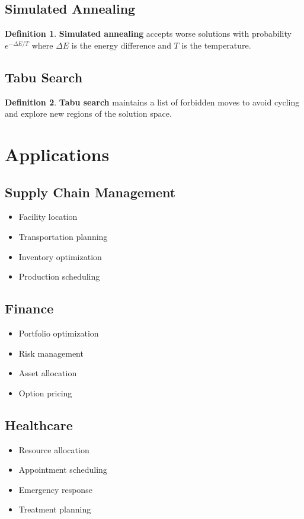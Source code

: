 \documentclass[11pt]{article}
\theoremstyle{definition}
\newtheorem{definition}{Definition}[section]
\begin{document}
\subsection{Simulated Annealing}
\begin{definition}
\textbf{Simulated annealing} accepts worse solutions with probability $e^{-\Delta E/T}$ where $\Delta E$ is the energy difference and $T$ is the temperature.
\end{definition}

\subsection{Tabu Search}
\begin{definition}
\textbf{Tabu search} maintains a list of forbidden moves to avoid cycling and explore new regions of the solution space.
\end{definition}

\section{Applications}

\subsection{Supply Chain Management}
\begin{itemize}
    \item Facility location
    \item Transportation planning
    \item Inventory optimization
    \item Production scheduling
\end{itemize}

\subsection{Finance}
\begin{itemize}
    \item Portfolio optimization
    \item Risk management
    \item Asset allocation
    \item Option pricing
\end{itemize}

\subsection{Healthcare}
\begin{itemize}
    \item Resource allocation
    \item Appointment scheduling
    \item Emergency response
    \item Treatment planning
\end{itemize}
\end{document}
